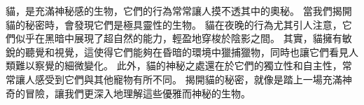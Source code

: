 貓，是充滿神秘感的生物，它們的行為常常讓人摸不透其中的奧秘。 當我們揭開貓的秘密時，會發現它們是極具靈性的生物。 貓在夜晚的行為尤其引人注意，它們似乎在黑暗中展現了超自然的能力，輕盈地穿梭於陰影之間。 其實，貓擁有敏銳的聽覺和視覺，這使得它們能夠在昏暗的環境中獵捕獵物，同時也讓它們看見人類難以察覺的細微變化。 此外，貓的神秘之處還在於它們的獨立性和自主性，常常讓人感受到它們與其他寵物有所不同。 揭開貓的秘密，就像是踏上一場充滿神奇的冒險，讓我們更深入地理解這些優雅而神秘的生物。
~ \\

\noindent{}